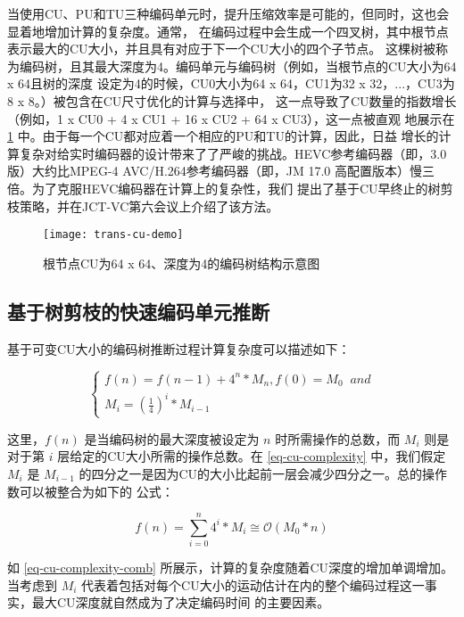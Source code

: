 当使用CU、PU和TU三种编码单元时，提升压缩效率是可能的，但同时，这也会显着地增加计算的复杂度。通常，
在编码过程中会生成一个四叉树，其中根节点表示最大的CU大小，并且具有对应于下一个CU大小的四个子节点。
这棵树被称为编码树，且其最大深度为4。编码单元与编码树（例如，当根节点的CU大小为64 x 64且树的深度
设定为4的时候，CU0大小为64 x 64，CU1为32 x 32，...，CU3为8 x 8。）被包含在CU尺寸优化的计算与选择中，
这一点导致了CU数量的指数增长（例如，1 x CU0 + 4 x CU1 + 16 x CU2 + 64 x CU3），这一点被直观
地展示在 \ref {fig:trans-cu-demo} 中。由于每一个CU都对应着一个相应的PU和TU的计算，因此，日益
增长的计算复杂对给实时编码器的设计带来了了严峻的挑战。HEVC参考编码器（即，3.0版）大约比MPEG-4 
AVC/H.264参考编码器（即，JM 17.0 高配置版本）慢三倍。为了克服HEVC编码器在计算上的复杂性，我们
提出了基于CU早终止的树剪枝策略，并在JCT-VC第六会议上介绍了该方法。

\begin{figure}[H] %
  \centering
  \texttt{[image: trans-cu-demo]}
  \caption{根节点CU为64 x 64、深度为4的编码树结构示意图}
  \label{fig:trans-cu-demo}
\end{figure}


\subsection{基于树剪枝的快速编码单元推断}

基于可变CU大小的编码树推断过程计算复杂度可以描述如下：

\begin{equation}
\label{eq-cu-complexity}
\left\{\begin{array}{l}
f(n) = f(n - 1) + 4^n * M_n, f(0) = M_0 \;\; and \\
M_i = {(\frac14)}^i * M_{i - 1}
\end{array}\right.
\end{equation}

这里，$f(n)$ 是当编码树的最大深度被设定为 $n$ 时所需操作的总数，而 $M_i$ 则是
对于第 $i$ 层给定的CU大小所需的操作总数。在 \ref{eq-cu-complexity} 中，我们假定 $M_i$ 是
$M_{i-1}$ 的四分之一是因为CU的大小比起前一层会减少四分之一。总的操作数可以被整合为如下的
公式：

\begin{equation}
\label{eq-cu-complexity-comb}
f(n) = \sum_{i=0}^n 4^i * M_i \cong \mathcal{O} (M_0 * n)
\end{equation}

如 \ref{eq-cu-complexity-comb} 所展示，计算的复杂度随着CU深度的增加单调增加。当考虑到 $M_i$
代表着包括对每个CU大小的运动估计在内的整个编码过程这一事实，最大CU深度就自然成为了决定编码时间
的主要因素。

